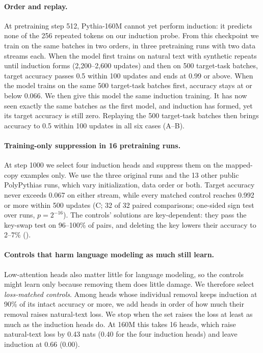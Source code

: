 \paragraph{Order and replay.}
At pretraining step 512, Pythia-160M cannot yet perform induction: it predicts
none of the 256 repeated tokens on our induction probe. From this checkpoint we
train on the same batches in two orders, in three pretraining runs with two data
streams each. When the model first trains on natural text with synthetic repeats
until induction forms (2,200--2,600 updates) and then on 500 target-task batches,
target accuracy passes 0.5 within 100 updates and ends at 0.99 or above. When the
model trains on the same 500 target-task batches first, accuracy stays at or below
0.066. We then give this model the same induction training. It has now seen
exactly the same batches as the first model, and induction has formed, yet its
target accuracy is still zero. Replaying the 500 target-task batches then brings
accuracy to 0.5 within 100 updates in all six cases (A--B).

\paragraph{Training-only suppression in 16 pretraining runs.}
At step 1000 we select four induction heads and suppress them on the mapped-copy
examples only. We use the three original runs and the 13 other public PolyPythias
runs, which vary initialization, data order or both. Target accuracy never exceeds
0.067 on either stream, while every matched control reaches 0.992 or more within 500
updates (C; 32 of 32 paired comparisons; one-sided sign test over
runs, $p=2^{-16}$). The controls' solutions are key-dependent: they pass the key-swap
test on 96--100\% of pairs, and deleting the key lowers their accuracy to 2--7\%
().

\paragraph{Controls that harm language modeling as much still learn.}
Low-attention heads also matter little for language modeling, so the controls might
learn only because removing them does little damage. We therefore select
\emph{loss-matched controls}. Among heads whose individual removal keeps induction at
90\% of its intact accuracy or more, we add heads in order of how much their removal
raises natural-text loss. We stop when the set raises the loss at least as much as
the induction heads do. At 160M this takes 16 heads, which raise natural-text loss by
0.43 nats (0.40 for the four induction heads) and leave induction at 0.66 (0.00).

